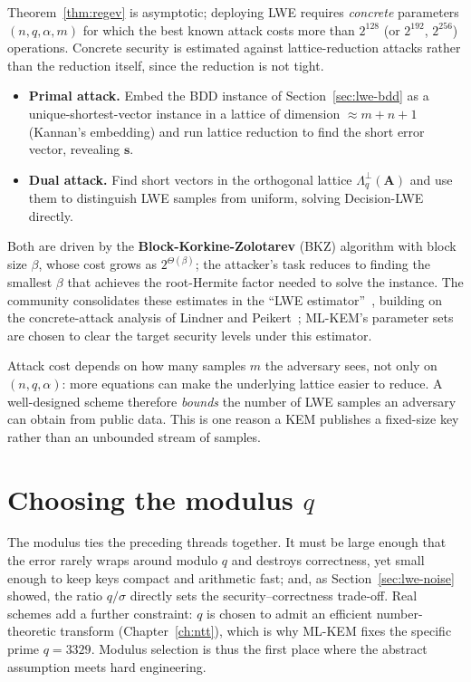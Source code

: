 Theorem~\ref{thm:regev} is asymptotic; deploying LWE requires \emph{concrete} parameters $(n,q,\alpha,m)$ for which the best known attack costs more than $2^{128}$ (or $2^{192}$, $2^{256}$) operations. Concrete security is estimated against lattice-reduction attacks rather than the reduction itself, since the reduction is not tight.

\begin{itemize}
  \item \textbf{Primal attack.} Embed the BDD instance of Section~\ref{sec:lwe-bdd} as a unique-shortest-vector instance in a lattice of dimension $\approx m+n+1$ (Kannan's embedding) and run lattice reduction to find the short error vector, revealing $\mathbf{s}$.
  \item \textbf{Dual attack.} Find short vectors in the orthogonal lattice $\Lambda_q^{\perp}(\mathbf{A})$ and use them to distinguish LWE samples from uniform, solving Decision-LWE directly.
\end{itemize}

Both are driven by the \textbf{Block-Korkine-Zolotarev} (BKZ) algorithm with block size $\beta$, whose cost grows as $2^{\Theta(\beta)}$; the attacker's task reduces to finding the smallest $\beta$ that achieves the root-Hermite factor needed to solve the instance. The community consolidates these estimates in the ``LWE estimator''~\cite{aps2015}, building on the concrete-attack analysis of Lindner and Peikert~\cite{lindnerpeikert2011}; ML-KEM's parameter sets are chosen to clear the target security levels under this estimator.

\begin{remark}
Attack cost depends on how many samples $m$ the adversary sees, not only on $(n,q,\alpha)$: more equations can make the underlying lattice easier to reduce. A well-designed scheme therefore \emph{bounds} the number of LWE samples an adversary can obtain from public data. This is one reason a KEM publishes a fixed-size key rather than an unbounded stream of samples.
\end{remark}

\section{Choosing the modulus $q$}

The modulus ties the preceding threads together. It must be large enough that the error rarely wraps around modulo $q$ and destroys correctness, yet small enough to keep keys compact and arithmetic fast; and, as Section~\ref{sec:lwe-noise} showed, the ratio $q/\sigma$ directly sets the security--correctness trade-off. Real schemes add a further constraint: $q$ is chosen to admit an efficient number-theoretic transform (Chapter~\ref{ch:ntt}), which is why ML-KEM fixes the specific prime $q=3329$. Modulus selection is thus the first place where the abstract assumption meets hard engineering.

